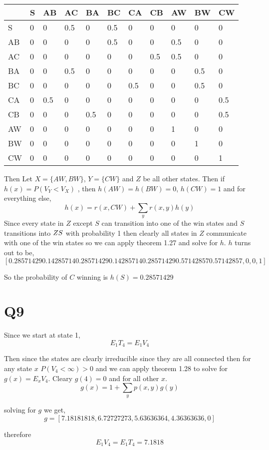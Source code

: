 \documentclass{article}
\begin{document}
\begin{tabular}{|l|l|l|l|l|l|l|l|l|l|l|}
\hline
   & S & AB  & AC  & BA  & BC  & CA  & CB  & AW  & BW  & CW  \\ 
   \hline
S  & 0 & 0   & 0.5 & 0   & 0.5 & 0   & 0   & 0   & 0   & 0   \\ 
\hline
AB & 0 & 0   & 0   & 0   & 0.5 & 0   & 0   & 0.5 & 0   & 0   \\ 
\hline
AC & 0 & 0   & 0   & 0   & 0   & 0   & 0.5 & 0.5 & 0   & 0   \\ 
\hline
BA & 0 & 0   & 0.5 & 0   & 0   & 0   & 0   & 0   & 0.5 & 0   \\ 
\hline
BC & 0 & 0   & 0   & 0   & 0   & 0.5 & 0   & 0   & 0.5 & 0   \\ 
\hline
CA & 0 & 0.5 & 0   & 0   & 0   & 0   & 0   & 0   & 0   & 0.5 \\ 
\hline
CB & 0 & 0   & 0   & 0.5 & 0   & 0   & 0   & 0   & 0   & 0.5 \\ 
\hline
AW & 0 & 0   & 0   & 0   & 0   & 0   & 0   & 1   & 0   & 0   \\ 
\hline
BW & 0 & 0   & 0   & 0   & 0   & 0   & 0   & 0   & 1   & 0   \\ 
\hline
CW & 0 & 0   & 0   & 0   & 0   & 0   & 0   & 0   & 0   & 1 \\ \hline
\end{tabular}

Then Let $X = \{AW, BW\}$, $Y = \{CW\}$ and $Z$ be all other states. 
Then if $h(x) = P(V_Y < V_X)$ , then $h(AW) = h(BW) = 0$, $h(CW) = 1$ and for everything else,
\[
h(x) = r(x,CW) + \sum_y r(x,y)h(y)
\]
Since every state in $Z$ except $S$ can transition into one of the win states and $S$ transitions into $Z \\ S$ with probability 1 then clearly all states in $Z$ communicate with one of the win states so we can apply theorem 1.27 and solve for $h$.
$h$ turns out to be,
\[
[ 0.28571429  0.14285714  0.28571429  0.14285714  0.28571429  0.57142857
  0.57142857, 0, 0, 1]
  \]
  
So the probability of $C$ winning is $h(S) = 0.28571429$

\section*{Q9}
Since we start at state 1,
\[
E_1T_4 = E_1V_4
\]

Then since the states are clearly irreducible since they are all connected then for any state $x$ $P(V_4 < \infty) > 0 $ and we can apply theorem 1.28 to solve for
$
g(x) = E_xV_4
$. 
Cleary $g(4) = 0$  and for all other $x$.
\[
g(x) = 1 + \sum_y p(x,y)g(y)
\]

solving for $g$ we get, 
\[
g = [ 7.18181818,  6.72727273,  5.63636364,  4.36363636,0]
\]

therefore
\[
E_1V_4 = E_1T_4 = 7.1818
\]
\end{document}
